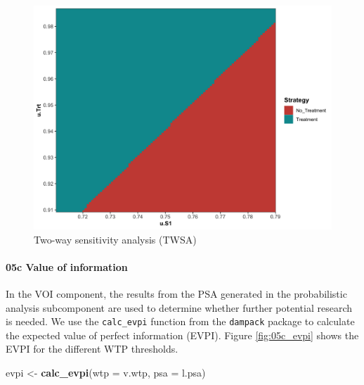 \documentclass[]{article}
\newenvironment{Shaded}{\begin{snugshade}}{\end{snugshade}}
\newcommand{\KeywordTok}[1]{\textcolor[rgb]{0.13,0.29,0.53}{\textbf{#1}}}
\newcommand{\DataTypeTok}[1]{\textcolor[rgb]{0.13,0.29,0.53}{#1}}
\newcommand{\StringTok}[1]{\textcolor[rgb]{0.31,0.60,0.02}{#1}}
\newcommand{\NormalTok}[1]{#1}
\let\oldparagraph\paragraph
\renewcommand{\paragraph}[1]{\oldparagraph{#1}\mbox{}}
\begin{document}
\begin{figure}
\centering
\includegraphics{../figs/05b_twsa-lrm-uS1-uTrt-nmb.png}
\caption{Two-way sensitivity analysis (TWSA)
\label{fig:05b_twsa-lrm-uS1-uTrt-nmb}}
\end{figure}

\paragraph{05c Value of information}\label{c-value-of-information}

In the VOI component, the results from the PSA generated in the
probabilistic analysis subcomponent are used to determine whether
further potential research is needed. We use the \texttt{calc\_evpi}
function from the \texttt{dampack} package to calculate the expected
value of perfect information (EVPI). Figure \ref{fig:05c_evpi} shows the
EVPI for the different WTP thresholds.

\begin{Shaded}
\begin{Highlighting}[]
\NormalTok{evpi <-}\StringTok{ }\KeywordTok{calc_evpi}\NormalTok{(}\DataTypeTok{wtp =}\NormalTok{ v.wtp, }\DataTypeTok{psa =}\NormalTok{ l.psa)}
\end{Highlighting}
\end{Shaded}
\end{document}
